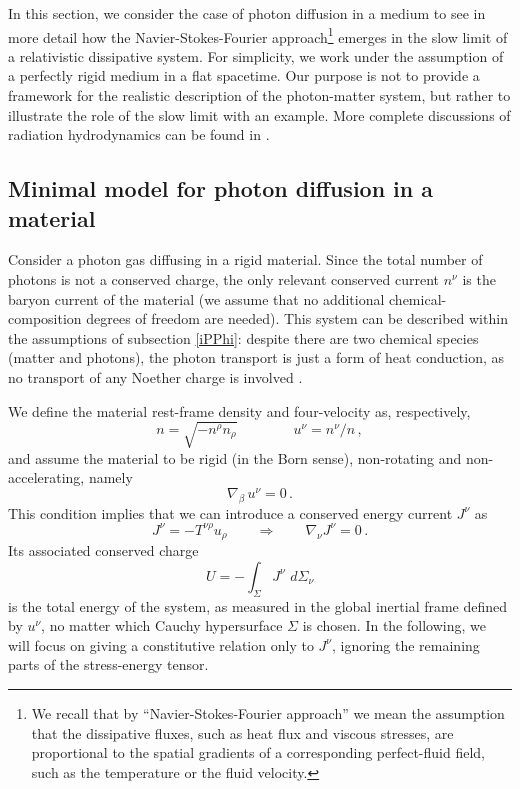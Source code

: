\documentclass[a4paper, amsfonts, amssymb, amsmath, reprint, twocolumn, showkeys, nofootinbib]{revtex4-2}
\begin{document}
In this section, we consider the case of  photon diffusion in a medium to see in more detail how the Navier-Stokes-Fourier approach\footnote{
We recall that by ``Navier-Stokes-Fourier approach'' we mean the assumption that the dissipative fluxes, such as heat flux and viscous stresses, are proportional to the spatial gradients of a corresponding perfect-fluid field, such as the temperature or the fluid velocity. 
}
emerges in the slow limit of a relativistic dissipative system. For simplicity, we work under the assumption of a perfectly rigid medium in a flat spacetime. 
Our purpose is not to provide a framework for the realistic description of the photon-matter system, but rather to illustrate the role of the slow limit with an example. More complete discussions of radiation hydrodynamics can be found in \citet{AnileRadiazion1992,UdeyIsrael1982,Farris2008,Sadowski2013,GavassinoRadiazione}. 

\subsection{Minimal model for photon diffusion in a material}
  
Consider a photon gas diffusing in a rigid material. Since the total number of photons is not a conserved charge, the only relevant conserved current $n^\nu$ is the baryon current of the material (we assume that no additional chemical-composition degrees of freedom are needed). This system can be described within the assumptions of subsection \ref{iPPhi}: despite there are two chemical species (matter and photons), the photon transport is just a form of heat conduction, as no transport of any Noether charge is involved \citep{GavassinoRadiazione,GavassinoTermometri}. 

We define the material rest-frame density and four-velocity as, respectively,
\begin{equation}
n=\sqrt{-n^\rho n_\rho}    \quad \quad   \quad \quad   u^\nu = {n^\nu}/{n} \, , 
\end{equation}
and assume the material to be rigid (in the Born sense), non-rotating and non-accelerating, namely  
\begin{equation}\label{eofmvc}
\nabla_\beta \,  u^\nu = 0 \, .
\end{equation}
This condition implies that we can introduce a conserved energy current $J^\nu $ as
\begin{equation}\label{fermati}
J^\nu =- T^{\nu \rho}u_\rho 
\qquad  \Rightarrow  \qquad 
\nabla_\nu J^\nu =0 \, .
\end{equation}
Its associated conserved charge
\begin{equation}
U = -\int_\Sigma J^\nu \, \,  d\Sigma_\nu
\end{equation}
is the total energy of the system, as measured in the global inertial frame defined by $u^\nu$, no matter which Cauchy hypersurface $\Sigma$ is chosen. In the following, we will focus on giving a constitutive relation only to $J^\nu$, ignoring the remaining parts of the stress-energy tensor.
\end{document}
